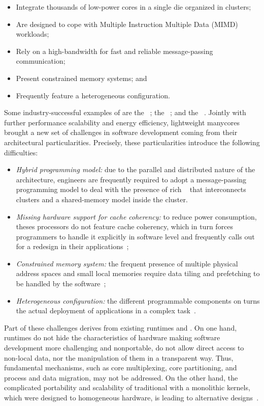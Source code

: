 	\begin{itemize}
		\item Integrate thousands of low-power cores in a single die organized in clusters;
		\item Are designed to cope with Multiple Instruction Multiple Data (MIMD) workloads;
		\item Rely on a high-bandwidth \noc for fast and reliable message-passing communication;
		\item Present constrained memory systems; and
		\item Frequently feature a heterogeneous configuration.
	\end{itemize}

	Some industry-successful examples of \lightweight \manycores are
	the \mppa~\cite{DeDinechin2013-1};
	the \epiphany~\cite{olofsson2014}; and
	the \taihulight~\cite{zheng2015}.
	Jointly with further performance scalability and energy efficiency, lightweight manycores brought
	a new set of challenges in software development coming from their architectural particularities.
	Precisely, these particularities introduce the following difficulties:
	\begin{itemize}
		\item \textit{Hybrid programming model:} due to the parallel and distributed nature of
			the architecture, engineers are frequently required to adopt a message-passing
			programming model to deal with the presence of rich \nocs~\cite{kelly2013} that
			interconnects clusters and a shared-memory model inside the cluster.
		\item \textit{Missing hardware support for cache coherency:} to reduce power consumption,
			theses processors do not feature cache coherency, which in turn forces programmers to
			handle it explicitly in software level and frequently calls out for a redesign in their
			applications~\cite{francesquini2015};
		\item \textit{Constrained memory system:} the frequent presence of multiple physical
			address spaces and small local memories require data tiling and prefetching to be
			handled by the software~\cite{Castro2016};
		\item \textit{Heterogeneous configuration:} the different programmable components on
			\lightweight \manycores turns the actual deployment of applications in a
			complex task~\cite{barbalace2015}.
	\end{itemize}

	Part of these challenges derives from existing runtimes and \oss.
	On one hand, runtimes do not hide the characteristics of hardware making
	software development more challenging and nonportable, \eg do not allow
	direct access to non-local data, nor the manipulation of them in a transparent way.
	Thus, fundamental \os mechanisms, such as core multiplexing, core partitioning,
	and process and data migration, may not be addressed.
	On the other hand, the complicated portability and scalability of traditional \oss with a
	monolithic kernels, which were designed to homogeneous hardware, is leading to alternative
	\os designs~\cite{Baumann2009, kluge2014, nightingale2009, rhoden2011}.

